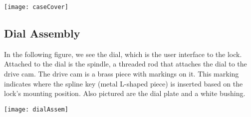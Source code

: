 \documentclass[11pt, letterpaper]{article}
\begin{document}
\begin{center}
  \texttt{[image: caseCover]}
\end{center}

\subsection*{Dial Assembly}
In the following figure, we see the dial, which is the user interface to the lock.
Attached to the dial is the spindle, a threaded rod that attaches the dial to the
drive cam. The drive cam is a brass piece with markings on it. This marking
indicates where the spline key (metal L-shaped piece) is inserted based on the
lock's mounting position. Also pictured are the dial plate and a white bushing.

\begin{center}
  \texttt{[image: dialAssem]}
\end{center}
\end{document}

